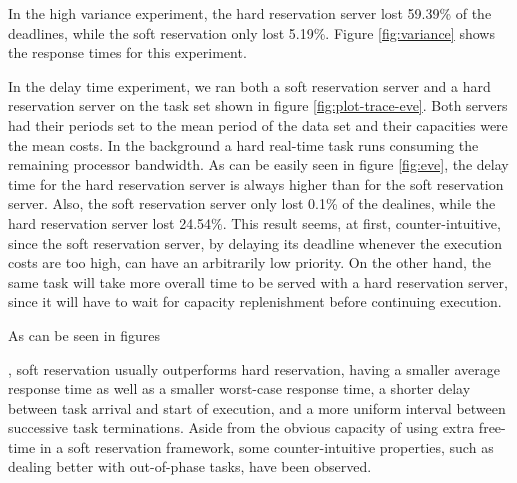 \documentclass[times, 10pt,twocolumn]{article}
\newcounter{notecounter}
\newcommand{\nota}[1]{\addtocounter{notecounter}{1}{\textcolor{red}{[nota
      \arabic{notecounter}: #1]}}}
\begin{document}
In the high variance experiment, the hard reservation server lost
59.39\% of the deadlines, while the soft reservation only lost
5.19\%. Figure \ref{fig:variance} shows the response times for this
experiment.

\begin{figure*}[t]
  \centering
  \caption{Delay times for the movie trace.}
  \label{fig:eve}
\end{figure*}


In the delay time experiment, we ran both a soft reservation server
and a hard reservation server on the task set shown in figure
\ref{fig:plot-trace-eve}. Both servers had their periods set to the
mean period of the data set and their capacities were the mean
costs. In the background a hard real-time task runs consuming the
remaining processor bandwidth. As can be easily seen in figure
\ref{fig:eve}, the delay time for the hard reservation server is
always higher than for the soft reservation server. Also, the soft
reservation server only lost 0.1\% of the dealines, while the hard
reservation server lost 24.54\%. This result seems, at first,
counter-intuitive, since the soft reservation server, by delaying its
deadline whenever the execution costs are too high, can have an
arbitrarily low priority. On the other hand, the same task will take
more overall time to be served with a hard reservation server, since
it will have to wait for capacity replenishment before continuing
execution.


\label{sec:conclusion}

As can be seen in figures \nota{colocar as figuras}, soft reservation
usually outperforms hard reservation, having a smaller average
response time as well as a smaller worst-case response time, a shorter
delay between task arrival and start of execution, and a more uniform
interval between successive task terminations. Aside from the obvious
capacity of using extra free-time in a soft reservation framework,
some counter-intuitive properties, such as dealing better with
out-of-phase tasks, have been observed.




\end{document}
